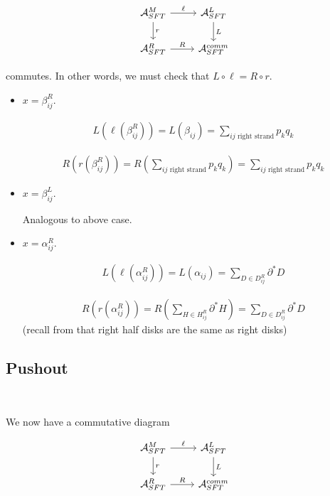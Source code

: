 \documentclass[a4paper,final, reqno]{amsart}
\theoremstyle{plain}
\theoremstyle{definition}
\newcommand{\A}{\mathcal{A}}
\begin{document}
	\[\begin{tikzcd}
		\A^M_{SFT} \arrow[r, "\ell"] \arrow[d, "r"] & \A^L_{SFT} \arrow[d, "L"] \\
		\A^R_{SFT} \arrow[r, "R"]           & \A^{comm}_{SFT}
	\end{tikzcd} \]
	
	commutes. In other words, we must check that $L \circ \ell = R \circ r$. 
	
	
	\begin{itemize}
		\item $x = \beta_{ij}^R$. 
		
		\begin{align*}
			L(\ell(\beta_{ij}^R)) = L(\beta_{ij}) = \sum_{ij \text{ right strand}} p_kq_k
		\end{align*}
		
		\begin{align*}
			R(r(\beta_{ij}^R)) = R\left(\sum_{ij \text{ right strand}} p_kq_k\right) = \sum_{ij \text{ right strand}} p_kq_k
		\end{align*}
		
		\item $x = \beta_{ij}^L$. 
		
		Analogous to above case.
		
		\item $x = \alpha_{ij}^R$. 
		
		\begin{align*}
			L(\ell(\alpha_{ij}^R)) = L(\alpha_{ij}) = \sum_{D\in D_{ij}^R} \partial^*D
		\end{align*}
		
		\begin{align*}
			R(r(\alpha_{ij}^R)) = R\left(\sum_{H\in H_{ij}^R} \partial^* H\right) = \sum_{D\in D_{ij}^R} \partial^* D
		\end{align*}
		(recall from  that right half disks are the same as right disks)
		
		
		
					
			
			
		\end{itemize}
		
		
		\subsection{Pushout}\-\
		
		We now have a commutative diagram 
		
		\[\begin{tikzcd}
			\A^M_{SFT} \arrow[r, "\ell"] \arrow[d, "r"] & \A^L_{SFT} \arrow[d, "L"] \\
			\A^R_{SFT} \arrow[r, "R"]           & \A^{comm}_{SFT}
		\end{tikzcd} \]
		
\end{document}
